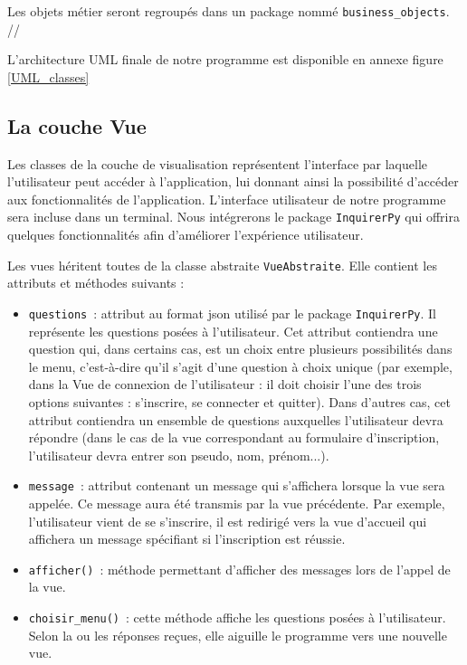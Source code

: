 \documentclass[11pt]{article}
\begin{document}
\bigbreak

Les objets métier seront regroupés dans un package nommé \texttt{business\_objects}. //

L'architecture UML finale de notre programme est disponible en annexe figure \ref{UML_classes}



\subsection{La couche Vue}

Les classes de la couche de visualisation représentent l'interface par laquelle l'utilisateur peut accéder à l'application, lui donnant ainsi la possibilité d'accéder aux fonctionnalités de l'application. L'interface utilisateur de notre programme sera incluse dans un terminal. Nous intégrerons le package \texttt{InquirerPy} qui offrira quelques fonctionnalités afin d'améliorer l'expérience utilisateur.
\bigbreak

Les vues héritent toutes de la classe abstraite \texttt{VueAbstraite}. Elle contient les attributs et méthodes suivants :
\begin{itemize}
    \item \texttt{questions}~: attribut au format json utilisé par le package \texttt{InquirerPy}. Il représente les questions posées à l'utilisateur. Cet attribut contiendra une question qui, dans certains cas, est un choix entre plusieurs possibilités dans le menu, c'est-à-dire qu'il s'agit d'une question à choix unique (par exemple, dans la Vue de connexion de l'utilisateur : il doit choisir l'une des trois options suivantes : s'inscrire, se connecter et quitter). Dans d'autres cas, cet attribut contiendra un ensemble de questions auxquelles l'utilisateur devra répondre (dans le cas de la vue correspondant au formulaire d'inscription, l'utilisateur devra entrer son pseudo, nom, prénom...).
    \item \texttt{message}~: attribut contenant un message qui s'affichera lorsque la vue sera appelée. Ce message aura été transmis par la vue précédente. Par exemple, l'utilisateur vient de se s'inscrire, il est redirigé vers la vue d'accueil qui affichera un message spécifiant si l'inscription est réussie.
    \item \texttt{afficher()}~: méthode permettant d'afficher des messages lors de l'appel de la vue.
    \item \texttt{choisir\_menu()}~: cette méthode affiche les questions posées à l'utilisateur. Selon la ou les réponses reçues, elle aiguille le programme vers une nouvelle vue.
\end{itemize}
\end{document}
